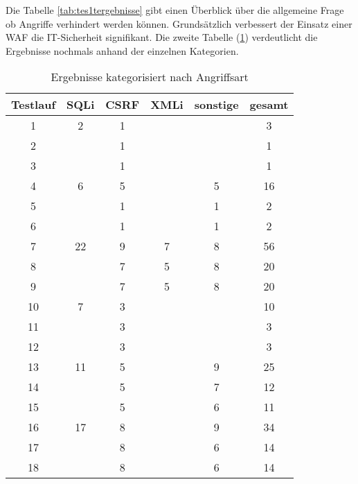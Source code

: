 Die Tabelle \ref{tab:tes1tergebnisse} gibt einen Überblick über die allgemeine Frage ob Angriffe verhindert werden können. Grundsätzlich verbessert der Einsatz einer WAF die IT-Sicherheit signifikant. Die zweite Tabelle (\ref{tab:tes2tergebnisse}) verdeutlicht die Ergebnisse nochmals anhand der einzelnen Kategorien.\\

\begin{table}[h]
    \centering
    \begin{tabular}{cccccc} 
      \toprule
    \textbf{Testlauf} & \textbf{SQLi} & \textbf{CSRF} & \textbf{XMLi} & \textbf{sonstige} & \textbf{gesamt} \\ 
     \midrule
      1 & 2 & 1 &  &  & 3\\
      2 &   & 1 &  &  & 1\\
      3 &   & 1 &  &  & 1\\
      4 & 6 & 5 &  & 5 & 16\\
      5 &   & 1 &  & 1  & 2 \\
      6 &   & 1 &  & 1  & 2 \\
      7 & 22 & 9 & 7 & 8& 56\\
      8 &  & 7 & 5 & 8 & 20 \\
      9 &  & 7 & 5 & 8 & 20 \\
      10 & 7 & 3 &  &  &  10  \\ 
      11 &  & 3 &  & & 3  \\
      12 &  & 3 &  & & 3  \\
      13 & 11 & 5 &  & 9 & 25 \\ 
      14 &   & 5 &  & 7  & 12 \\
      15 &   & 5 &  & 6  & 11 \\
      16 & 17 & 8 &  & 9 & 34  \\ 
      17 &  & 8 &  & 6 & 14 \\
      18 &  & 8 &  & 6 & 14 \\
   \bottomrule
    \end{tabular}
    \caption{Ergebnisse kategorisiert nach Angriffsart}
    \label{tab:tes2tergebnisse}
\end{table}


